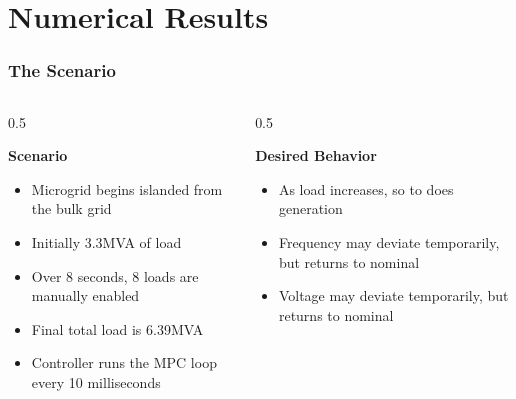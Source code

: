 \documentclass[
    aspectratio=169,
    \ifdefined\HANDOUT
    handout
    \else
    \fi
]{beamer}
\begin{document}
\section{Numerical Results}
\begin{frame}
    \frametitle{The Scenario}
    \begin{columns}
        \begin{column}[T]{0.5\textwidth}
            \vspace{0pt}
            \begin{center}
                \textbf{Scenario}
            \end{center}
            \begin{itemize}
                \item Microgrid begins islanded from the bulk grid
                \item Initially 3.3MVA of load
                \item Over 8 seconds, 8 loads are manually enabled
                \item Final total load is 6.39MVA
                \item Controller runs the MPC loop every 10 milliseconds
            \end{itemize}
        \end{column}
        \begin{column}[T]{0.5\textwidth}
            \begin{center}
                \textbf{Desired Behavior}
            \end{center}
            \begin{itemize}
                \item As load increases, so to does generation
                \item Frequency may deviate temporarily, but returns to nominal
                \item Voltage may deviate temporarily, but returns to nominal
            \end{itemize}
        \end{column}
    \end{columns}
\end{frame}
\end{document}
